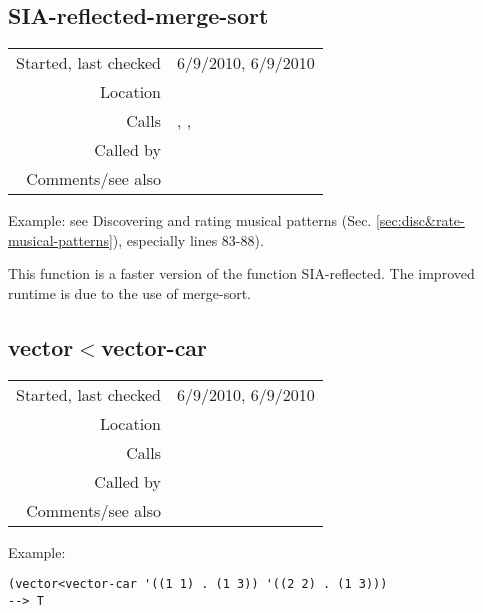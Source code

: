 \subsection*{SIA-reflected-merge-sort}\label{fun:SIA-reflected-merge-sort}

\vspace{0.3cm}
\begin{tabular}{r|p{8cm}}
Started, last checked & 6/9/2010, 6/9/2010 \\
Location & \nameref{sec:structural-induction-merge} \\
Calls & \nameref{fun:collect-by-cars-partition}, \nameref{fun:subtract-two-lists},\newline \nameref{fun:vector<vector-car} \\
Called by & \\
Comments/see also &
\end{tabular}

\vspace{0.5cm}
\noindent Example: see Discovering and rating musical
patterns (Sec. \ref{sec:disc&rate-musical-patterns}), 
especially lines 83-88).
\vspace{0.5cm}

\noindent This function is a faster version of the
function SIA-reflected. The improved runtime is due to
the use of merge-sort.


\subsection*{vector$<$vector-car}\label{fun:vector<vector-car}

\vspace{0.3cm}
\begin{tabular}{r|p{8cm}}
Started, last checked & 6/9/2010, 6/9/2010 \\
Location & \nameref{sec:structural-induction-merge} \\
Calls & \nameref{fun:vector<vector-t-or-nil} \\
Called by & \nameref{fun:SIA-reflected-merge-sort} \\
Comments/see also & \nameref{fun:vector<vector}
\end{tabular}

\vspace{0.5cm}
\noindent Example:
\begin{verbatim}
(vector<vector-car '((1 1) . (1 3)) '((2 2) . (1 3)))
--> T
\end{verbatim}

